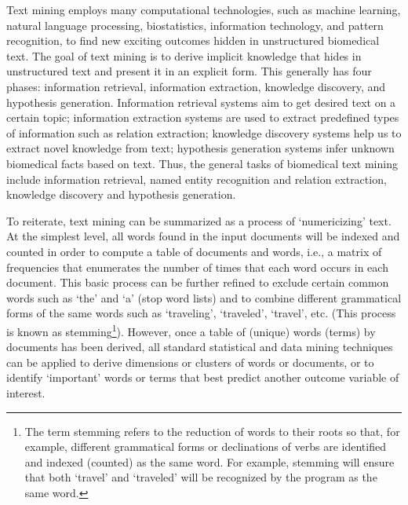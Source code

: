 Text mining employs many computational technologies, such as machine learning, natural language processing, biostatistics, information technology, and pattern recognition, to find new exciting outcomes hidden in unstructured biomedical text. The goal of text mining is to derive implicit knowledge that hides in unstructured text and present it in an explicit form. This generally has four phases: information retrieval, information extraction, knowledge discovery, and hypothesis generation. Information retrieval systems aim to get desired text on a certain topic; information extraction systems are used to extract predefined types of information such as relation extraction; knowledge discovery systems help us to extract novel knowledge from text; hypothesis generation systems infer unknown biomedical facts based on text. Thus, the general tasks of biomedical text mining include information retrieval, named entity recognition and relation extraction, knowledge discovery and hypothesis generation. \cite{zhu2013biomedical}

To reiterate, text mining can be summarized as a process of \enquote*{numericizing} text. At the simplest level, all words found in the input documents will be indexed and counted in order to compute a table of documents and words, i.e., a matrix of frequencies that enumerates the number of times that each word occurs in each document. This basic process can be further refined to exclude certain common words such as \enquote*{the} and \enquote*{a} (stop word lists) and to combine different grammatical forms of the same words such as \enquote*{traveling}, \enquote*{traveled}, \enquote*{travel}, etc. (This process is known as stemming\footnote{The term stemming refers to the reduction of words to their roots so that, for example, different grammatical forms or declinations of verbs are identified and indexed (counted) as the same word. For example, stemming will ensure that both \enquote*{travel} and \enquote*{traveled} will be recognized by the program as the same word.}). However, once a table of (unique) words (terms) by documents has been derived, all standard statistical and data mining techniques can be applied to derive dimensions or clusters of words or documents, or to identify \enquote*{important} words or terms that best predict another outcome variable of interest.


